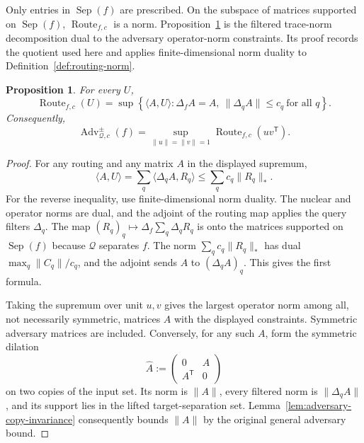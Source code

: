 \documentclass[11pt]{article}
\numberwithin{equation}{section}
\newtheorem{proposition}[definition]{Proposition}
\theoremstyle{remark}
\begin{document}
Only entries in $\operatorname{Sep}(f)$ are prescribed. On the subspace of
matrices supported on $\operatorname{Sep}(f)$, $\operatorname{Route}_{f,c}$ is a norm.
Proposition~\ref{prop:adversary-routing-duality} is the filtered trace-norm
decomposition dual to the adversary operator-norm constraints. Its proof
records the quotient used here and applies finite-dimensional norm duality to
Definition~\ref{def:routing-norm}.

\begin{proposition}
\label{prop:adversary-routing-duality}
\label{thm:source-routing-duality}
For every $U$,
\begin{equation}
    \operatorname{Route}_{f,c}(U)
    =
    \sup\left\{\langle A,U\rangle:\Delta_fA=A,\ \|\Delta_qA\|\leq c_q\ \text{for all }q\right\}.
\end{equation}
Consequently,
\begin{equation}
    \operatorname{Adv}^{\pm}_{\mathcal Q,c}(f)=\sup_{\|u\|=\|v\|=1}\operatorname{Route}_{f,c}(uv^{\mathsf T}).
\end{equation}
\end{proposition}

\begin{proof}
For any routing and any matrix $A$ in the displayed supremum,
\begin{equation}
    \langle A,U\rangle=\sum_q\langle\Delta_qA,R_q\rangle\leq\sum_q c_q\|R_q\|_*.
\end{equation}
For the reverse inequality, use finite-dimensional norm duality. The nuclear
and operator norms are dual, and the adjoint of the routing map applies the
query filters $\Delta_q$. The map
$(R_q)_q\mapsto\Delta_f\sum_q\Delta_qR_q$ is onto the matrices supported on
$\operatorname{Sep}(f)$ because $\mathcal Q$ separates $f$.  The norm
$\sum_qc_q\|R_q\|_*$ has dual $\max_q\|C_q\|/c_q$, and the adjoint sends
$A$ to $(\Delta_qA)_q$.  This gives the first formula.

Taking the supremum over unit $u,v$ gives the largest operator norm among
all, not necessarily symmetric, matrices $A$ with the displayed constraints.
Symmetric adversary matrices are included.  Conversely, for any such $A$,
form the symmetric dilation
\begin{equation}
    \widehat A:=\begin{pmatrix}0&A\\A^{\mathsf T}&0\end{pmatrix}
\end{equation}
on two copies of the input set.  Its norm is $\|A\|$, every filtered norm is
$\|\Delta_qA\|$, and its support lies in the lifted target-separation set.
Lemma~\ref{lem:adversary-copy-invariance} consequently bounds $\|A\|$ by the
original general adversary bound.
\end{proof}
\end{document}
